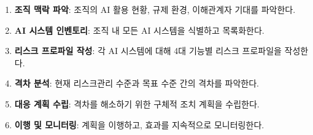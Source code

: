 \begin{enumerate}
 \item \textbf{조직 맥락 파악}: 조직의 AI 활용 현황, 규제 환경, 이해관계자 기대를 파악한다.
 \item \textbf{AI 시스템 인벤토리}: 조직 내 모든 AI 시스템을 식별하고 목록화한다.
 \item \textbf{리스크 프로파일 작성}: 각 AI 시스템에 대해 4대 기능별 리스크 프로파일을 작성한다.
 \item \textbf{격차 분석}: 현재 리스크관리 수준과 목표 수준 간의 격차를 파악한다.
 \item \textbf{대응 계획 수립}: 격차를 해소하기 위한 구체적 조치 계획을 수립한다.
 \item \textbf{이행 및 모니터링}: 계획을 이행하고, 효과를 지속적으로 모니터링한다.
\end{enumerate}

